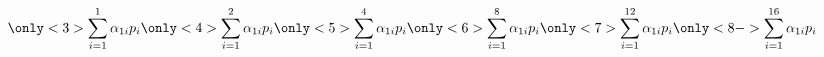 \begin{frame}
\begin{columns}
\begin{overlayarea}{\textwidth}{\textheight}
\begin{minipage}[t]{0.15\textwidth}
      \end{minipage}
      \begin{align*}
        \only<3>{\sum_{i=1}^{1} \alpha_{1i} p_i}
        \only<4>{\sum_{i=1}^{2} \alpha_{1i} p_i}
        \only<5>{\sum_{i=1}^{4} \alpha_{1i} p_i}
        \only<6>{\sum_{i=1}^{8} \alpha_{1i} p_i}
        \only<7>{\sum_{i=1}^{12} \alpha_{1i} p_i}
        \only<8->{\sum_{i=1}^{16} \alpha_{1i} p_i}
      \end{align*}
    \end{overlayarea}


\end{columns}
\end{frame}
